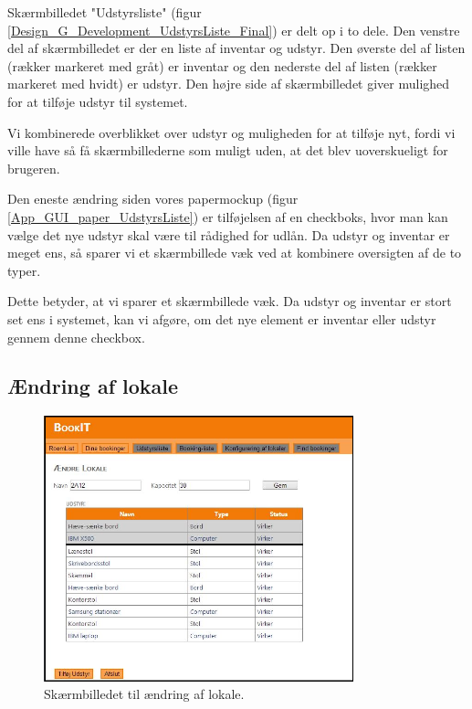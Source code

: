Skærmbilledet "Udstyrsliste" (figur \ref{Design_G_Development_UdstyrsListe_Final}) er delt op i to dele. Den venstre del af skærmbilledet er der en liste af inventar og udstyr. Den øverste del af listen (rækker markeret med gråt) er inventar og den nederste del af listen (rækker markeret med hvidt) er udstyr. Den højre side af skærmbilledet giver mulighed for at tilføje udstyr til systemet.

Vi kombinerede overblikket over udstyr og muligheden for at tilføje nyt, fordi vi ville have så få skærmbillederne som muligt uden, at det blev uoverskueligt for brugeren.

Den eneste ændring siden vores papermockup (figur \ref{App_GUI_paper_UdstyrsListe}) er tilføjelsen af en checkboks, hvor man kan vælge det nye udstyr skal være til rådighed for udlån. Da udstyr og inventar er meget ens, så sparer vi et skærmbillede væk ved at kombinere oversigten af de to typer.

Dette betyder, at vi sparer et skærmbillede væk. Da udstyr og inventar er stort set ens i systemet, kan vi afgøre, om det nye element er inventar eller udstyr gennem denne checkbox.

\subsection{Ændring af lokale}
\begin{figure}[h!]
  \centering
    \includegraphics[width=0.8\textwidth]{Appendix/GUI-Prototype/DigitalMockup/AendreLokale}
  \caption{Skærmbilledet til ændring af lokale.}
\label{Design_G_Development_AendreLokale_Final}
\end{figure} 

